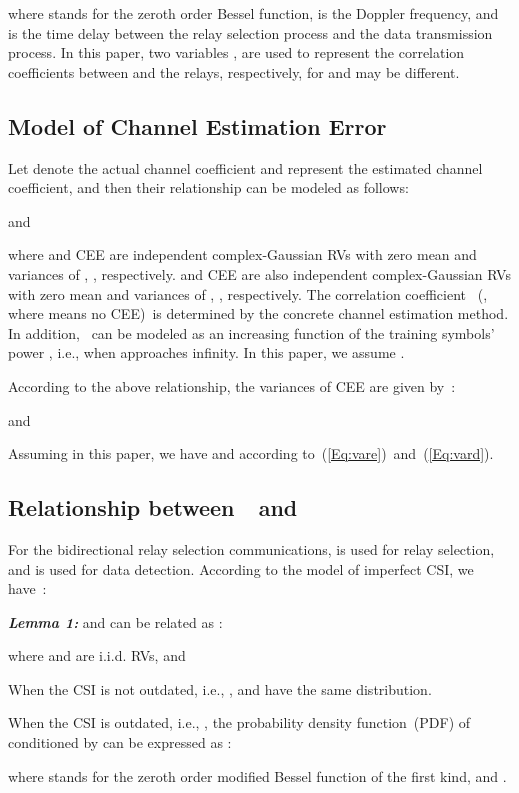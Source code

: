 \documentclass[onecolumn,letterpaper,11pt,draftclsnofoot]{IEEEtran}
\begin{document}
where  stands for the zeroth order Bessel
function\cite{Abramowitz},  is the Doppler frequency, and
 is the time delay between the relay selection process and the
data transmission process. In this paper, two variables
,  are used to represent the correlation
coefficients between  and the relays, respectively, for
 and  may be different.

\subsection{Model of Channel Estimation Error}
Let  denote the actual channel coefficient and 
represent the estimated channel coefficient, and then their relationship
can be modeled as follows\cite{Seyfi2010}:

and

where  and CEE  are independent complex-Gaussian RVs with zero
mean and variances of , , respectively.
 and CEE  are also independent complex-Gaussian RVs with
zero mean and variances of , ,
respectively. The correlation coefficient  ~(, where 
means no CEE)~is determined by the concrete channel estimation
method. In addition, ~can be modeled as an increasing
function of the training symbols' power , i.e., 
when  approaches infinity\cite{Yoo2006,Feifei2009}. In this
paper, we assume \cite{Ramya2009}.

According to the above relationship, the variances of CEE are given
by~:

and


Assuming  in this paper, we have  and  according
to~(\ref{Eq:vare})~and~(\ref{Eq:vard}).


\subsection{Relationship between~~and~~}
For the bidirectional relay selection communications,  is used for relay selection, and  is used
for data detection. According to the model of imperfect CSI, we
have~:

\textbf{\emph{Lemma 1: }} and  can be
related as :

where  and  are i.i.d. RVs, and


When the CSI is not outdated, i.e., ,  and   have the same
distribution.

When the CSI is outdated, i.e., , the probability
density function~(PDF) of  conditioned by  can be expressed as :

where  stands for the zeroth order modified
Bessel function of the first kind\cite{Abramowitz}, and .
\end{document}

